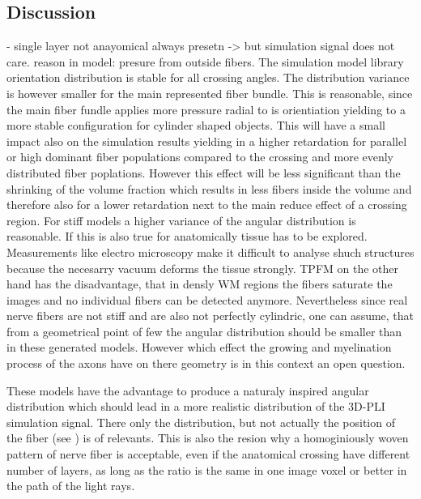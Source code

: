 \subsection{Discussion}
%
%
- single layer not anayomical always presetn -> but simulation signal does not care. reason in model: presure from outside fibers.
%
The simulation model library orientation distribution is stable for all crossing angles.
The distribution variance is however smaller for the main represented fiber bundle.
This is reasonable, since the main fiber fundle applies more pressure radial to is orientiation yielding to a more stable configuration for cylinder shaped objects.
This will have a small impact also on the simulation results yielding in a higher retardation for parallel or high dominant fiber populations compared to the crossing and more evenly distributed fiber poplations.
However this effect will be less significant than the shrinking of the volume fraction which results in less fibers inside the volume and therefore also for a lower retardation next to the main reduce effect of a crossing region.
For stiff models a higher variance of the angular distribution is reasonable.
If this is also true for anatomically tissue has to be explored.
Measurements like electro microscopy make it difficult to analyse shuch structures because the necesarry vacuum deforms the tissue strongly.
TPFM on the other hand has the disadvantage, that in densly \ac{WM} regions the fibers saturate the images and no individual fibers can be detected anymore.
Nevertheless since real nerve fibers are not stiff and are also not perfectly cylindric, one can assume, that from a geometrical point of few the angular distribution should be smaller than in these generated models.
However which effect the growing and myelination process of the axons have on there geometry is in this context an open question.
\par
%
These models have the advantage to produce a naturaly inspired angular distribution which should lead in a more realistic distribution of the \ac{3D-PLI} simulation signal.
There only the distribution, but not actually the position of the fiber (see \dummy{}) is of relevants.
This is also the resion why a homoginiously woven pattern of nerve fiber is acceptable, even if the anatomical crossing have different number of layers, as long as the ratio is the same in one image voxel or better in the path of the light rays.
%
